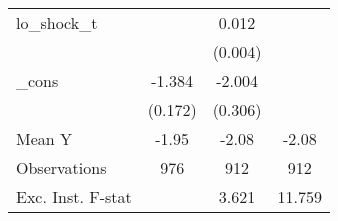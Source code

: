 {\begin{tabular}{l*{3}{c}}
\addlinespace
lo\_shock\_t  &                     &       0.012\sym{***}&                     \\
            &                     &     (0.004)         &                     \\
\addlinespace
\_cons      &      -1.384\sym{***}&      -2.004\sym{***}&                     \\
            &     (0.172)         &     (0.306)         &                     \\
\midrule
Mean Y      &       -1.95         &       -2.08         &       -2.08         \\
Observations&         976         &         912         &         912         \\
Exc. Inst. F-stat&                     &       3.621         &      11.759         \\
\bottomrule
\end{tabular}
}
